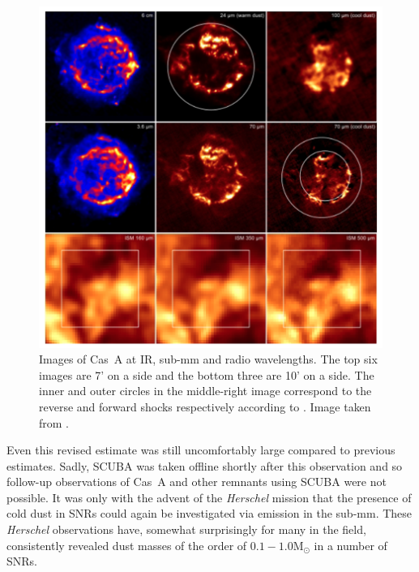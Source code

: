 \begin{figure}
\centering
\includegraphics[clip=true,scale=0.425,trim= 0 0 0 0]{chapters/chapter1/figs/CasA.png}
\caption{Images of Cas~A at IR, sub-mm and radio wavelengths.  The top six images are 7' on a side and the bottom three are 10' on a side.  The inner and outer circles in the middle-right image correspond to the reverse and forward shocks respectively according to \citep{Gotthelf2001}.  Image taken from \citet{Barlow2010}.}
\label{fig:CasA}
\end{figure}


Even this revised estimate was still uncomfortably large compared to previous estimates.  Sadly, SCUBA was taken offline shortly after this observation and so follow-up observations of Cas~A and other remnants using SCUBA were not possible.  It was only with the advent of the \textit{Herschel} mission that the presence of cold dust in SNRs could again be investigated via emission in the sub-mm.  These \textit{Herschel} observations have, somewhat surprisingly for many in the field, consistently revealed dust masses of the order of $0.1-1.0$M$_{\odot}$ in a number of SNRs.


